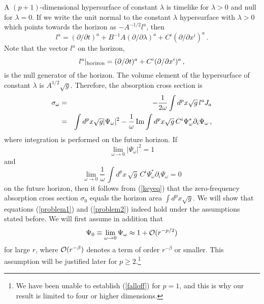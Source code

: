 \documentclass[a4paper,12pt]{article}
\begin{document}
A $(p+1)$-dimensional hypersurface of constant $\lambda$
is timelike for $\lambda >0$ and null for $\lambda =0$.
If we write the unit normal to the constant $\lambda$ hypersurface with 
$\lambda > 0$ which points towards the horizon as $-A^{-1/2} l^a$, then
\begin{equation}
l^a = 
(\partial/\partial t)^a
+ B^{-1}A(\partial/\partial\lambda)^a
+ C^i (\partial/\partial x^i)^a\,.
\end{equation} 
Note that the vector $l^a$ on the horizon,
\begin{equation}
l^a|_{\rm horizon} = 
(\partial/\partial t)^a
+ C^i(\partial/\partial x^i)^a\,,
\label{horla}
\end{equation}
is the null generator of the horizon.
The volume element of the hypersurface of constant $\lambda$ is 
$A^{1/2}\sqrt{g}$.  Therefore, the absorption cross section is
\begin{eqnarray}
\sigma_\omega & = & - \frac{1}{2\omega}\int d^p x \sqrt{g}\, 
l^a J_a \nonumber \\
& = & \int d^p x \sqrt{g} |\Psi_\omega|^2
- \frac{1}{\omega}\,{\rm Im}\int d^p x \sqrt{g}\,C^i 
\Psi_\omega^* \partial_i \Psi_\omega\,, \label{keyeq}
\end{eqnarray}
where integration is performed on the future horizon.
If
\begin{equation}
\lim_{\omega \to 0}|\Psi_\omega|^2 = 1 \label{problem1}
\end{equation}
and
\begin{equation}
\lim_{\omega \to 0}\frac{1}{\omega}\,\int d^p x\,\sqrt{g}\,C^i
\Psi^*_\omega \partial_i \Psi_\omega = 0 \label{problem2}
\end{equation}
on the future horizon,
then it follows from (\ref{keyeq}) that
the zero-frequency absorption cross section $\sigma_0$ equals the horizon area
$\int d^p x \sqrt{g}$. 
We will show that equations (\ref{problem1}) and
(\ref{problem2}) indeed hold under the assumptions stated before.
We will first assume in addition that 
\begin{equation}
\Psi_0 \equiv \lim_{\omega \to 0}\Psi_\omega \approx 1 + {\cal O}(r^{-p/2})
\label{falloff}
\end{equation}
for large $r$, where ${\cal O}(r^{-\beta})$ denotes a term of order
$r^{-\beta}$ or smaller.
This assumption will be justified later for $p\geq 2$.\footnote{
We have been unable
to establish (\ref{falloff}) for $p=1$, 
and this is why our result is limited to
four or higher dimensions.}
\end{document}
